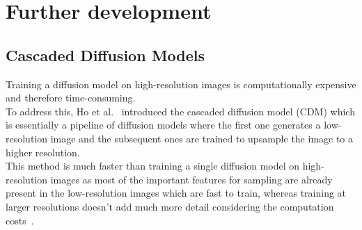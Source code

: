 \documentclass{article}
\numberwithin{equation}{section}
\numberwithin{figure}{section}
\begin{document}
\section{Further development}
\subsection{Cascaded Diffusion Models}
Training a diffusion model on high-resolution images is computationally expensive and therefore time-consuming. \\
To address this, Ho et al.~\cite{ho2021cascaded} introduced the cascaded diffusion model (CDM) which is essentially a pipeline of diffusion models where the first one generates a low-resolution image and the subsequent ones are trained to upsample the image to a higher resolution. \\
This method is much faster than training a single diffusion model on high-resolution images as most of the important features for sampling are already present in the low-resolution images which are fast to train, whereas training at larger resolutions doesn't add much more detail considering the computation costs~\cite{ho2021cascaded}.
\end{document}
